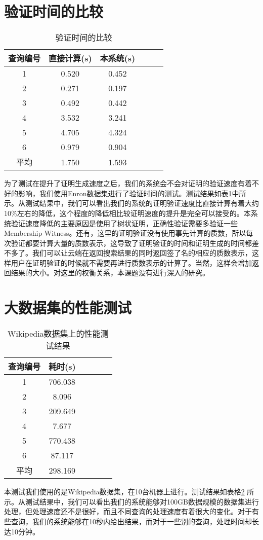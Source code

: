 \section{验证时间的比较}
\begin{table}[htb]
    \centering
    \caption{验证时间的比较}
    \begin{tabular}{cccccc}
        \toprule
        查询编号 & 直接计算(s) & 本系统(s) \\
        \midrule
        1 & 0.520 & 0.452 \\
        2 & 0.271 & 0.197 \\
        3 & 0.492 & 0.442 \\
        4 & 3.532 & 3.241 \\
        5 & 4.705 & 4.324 \\
        6 & 0.979 & 0.904 \\
        \midrule
        平均 & 1.750 & 1.593 \\
        \bottomrule
    \end{tabular}
    \label{tab:verifying_time}
\end{table}
为了测试在提升了证明生成速度之后，我们的系统会不会对证明的验证速度有着不好的影响，我们使用Enron数据集进行了验证时间的测试。测试结果如表\ref{tab:verifying_time}中所示。从测试结果中，我们可以看出我们的系统的证明验证速度比直接计算有着大约10\%左右的降低，这个程度的降低相比较证明速度的提升是完全可以接受的。本系统验证速度降低的主要原因是使用了树状证明，正确性验证需要多验证一些Membership Witness。还有，这里的证明验证没有使用事先计算的质数，所以每次验证都要计算大量的质数表示，这导致了证明验证的时间和证明生成的时间都差不多了。我们可以让云端在返回搜索结果的同时返回签了名的相应的质数表示，这样用户在证明验证的时候就不需要再进行质数表示的计算了。当然，这样会增加返回结果的大小。对这里的权衡关系，本课题没有进行深入的研究。

\section {大数据集的性能测试}
\begin{table}[htb]
    \centering
    \caption{Wikipedia数据集上的性能测试结果}
    \begin{tabular}{cccccc}
        \toprule
        查询编号 & 耗时(s) \\
        \midrule
        1 & 706.038  \\
        2 & 8.096  \\
        3 & 209.649  \\
        4 & 7.677  \\
        5 & 770.438  \\
        6 & 87.117  \\
        \midrule
        平均 & 298.169  \\
        \bottomrule
    \end{tabular}
    \label{tab:wiki_speedup}
\end{table}
本测试我们使用的是Wikipedia数据集，在10台机器上进行。测试结果如表格\ref{tab:wiki_speedup} 所示。从测试结果中，我们可以看出我们的系统能够对100GB数据规模的数据集进行处理，但处理速度还不是很好，而且不同查询的处理速度有着很大的变化。对于有些查询，我们的系统能够在10秒内给出结果，而对于一些别的查询，处理时间却长达10分钟。

